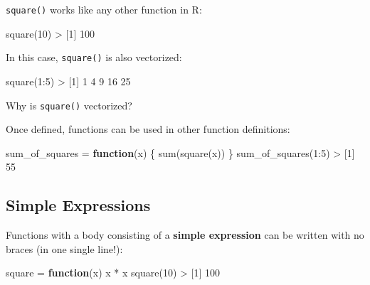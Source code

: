\documentclass[
]{book}
\newenvironment{Shaded}{\begin{snugshade}}{\end{snugshade}}
\newcommand{\ControlFlowTok}[1]{\textcolor[rgb]{0.13,0.29,0.53}{\textbf{#1}}}
\newcommand{\DecValTok}[1]{\textcolor[rgb]{0.00,0.00,0.81}{#1}}
\newcommand{\FunctionTok}[1]{\textcolor[rgb]{0.00,0.00,0.00}{#1}}
\newcommand{\NormalTok}[1]{#1}
\newcommand{\OtherTok}[1]{\textcolor[rgb]{0.56,0.35,0.01}{#1}}
\newcommand{\SpecialCharTok}[1]{\textcolor[rgb]{0.00,0.00,0.00}{#1}}
\begin{document}
\texttt{square()} works like any other function in R:

\begin{Shaded}
\begin{Highlighting}[]
\FunctionTok{square}\NormalTok{(}\DecValTok{10}\NormalTok{)}
\SpecialCharTok{\textgreater{}}\NormalTok{ [}\DecValTok{1}\NormalTok{] }\DecValTok{100}
\end{Highlighting}
\end{Shaded}

In this case, \texttt{square()} is also vectorized:

\begin{Shaded}
\begin{Highlighting}[]
\FunctionTok{square}\NormalTok{(}\DecValTok{1}\SpecialCharTok{:}\DecValTok{5}\NormalTok{)}
\SpecialCharTok{\textgreater{}}\NormalTok{ [}\DecValTok{1}\NormalTok{]  }\DecValTok{1}  \DecValTok{4}  \DecValTok{9} \DecValTok{16} \DecValTok{25}
\end{Highlighting}
\end{Shaded}

Why is \texttt{square()} vectorized?

Once defined, functions can be used in other function definitions:

\begin{Shaded}
\begin{Highlighting}[]
\NormalTok{sum\_of\_squares }\OtherTok{=} \ControlFlowTok{function}\NormalTok{(x) \{}
  \FunctionTok{sum}\NormalTok{(}\FunctionTok{square}\NormalTok{(x))}
\NormalTok{\}}
\FunctionTok{sum\_of\_squares}\NormalTok{(}\DecValTok{1}\SpecialCharTok{:}\DecValTok{5}\NormalTok{)}
\SpecialCharTok{\textgreater{}}\NormalTok{ [}\DecValTok{1}\NormalTok{] }\DecValTok{55}
\end{Highlighting}
\end{Shaded}

\hypertarget{simple-expressions-1}{%
\subsection{Simple Expressions}\label{simple-expressions-1}}

Functions with a body consisting of a \textbf{simple expression} can be written with
no braces (in one single line!):

\begin{Shaded}
\begin{Highlighting}[]
\NormalTok{square }\OtherTok{=} \ControlFlowTok{function}\NormalTok{(x) x }\SpecialCharTok{*}\NormalTok{ x}
\FunctionTok{square}\NormalTok{(}\DecValTok{10}\NormalTok{)}
\SpecialCharTok{\textgreater{}}\NormalTok{ [}\DecValTok{1}\NormalTok{] }\DecValTok{100}
\end{Highlighting}
\end{Shaded}
\end{document}
